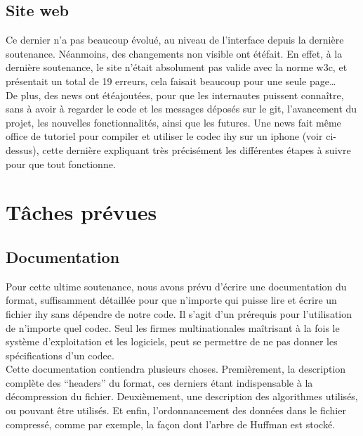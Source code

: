 \documentclass[a4paper,12pt]{article}
\begin{document}
	\subsection{Site web}
Ce dernier n'a pas beaucoup \'evolu\'e, au niveau de l'interface depuis la derni\`ere
soutenance. N\'eanmoins, des changements non visible ont \'et\'efait. En effet, à la
derni\`ere soutenance, le site n'\'etait absolument pas valide avec la norme w3c, et
pr\'esentait un total de 19 erreurs, cela faisait beaucoup pour une seule
page\ldots\\
De plus, des news ont \'et\'eajout\'ees, pour que les internautes puissent connaître,
sans à avoir à regarder le code et les messages d\'epos\'es sur le git, l'avancement
du projet, les nouvelles fonctionnalit\'es, ainsi que les futures. Une news fait
m\^eme office de tutoriel pour compiler et utiliser le codec ihy sur un iphone
(voir ci-dessus), cette derni\`ere expliquant tr\`es pr\'ecis\'ement les diff\'erentes
\'etapes à suivre pour que tout fonctionne.

\newpage

\section{Tâches pr\'evues}
	\subsection{Documentation}
Pour cette ultime soutenance, nous avons pr\'evu d'\'ecrire une documentation du
format, suffisamment d\'etaill\'ee pour que n'importe qui puisse lire et \'ecrire un
fichier ihy sans d\'ependre de notre code. Il s'agit d'un pr\'erequis pour
l'utilisation de n'importe quel codec. Seul les firmes multinationales
maîtrisant à la fois le syst\`eme d'exploitation et les logiciels, peut se
permettre de ne pas donner les sp\'ecifications d'un codec.\\
Cette documentation contiendra plusieurs choses. Premi\`erement, la description
compl\`ete des ``headers'' du format, ces derniers \'etant indispensable à la
d\'ecompression du fichier. Deuxi\`emement, une description des algorithmes
utilis\'es, ou pouvant \^etre utilis\'es. Et enfin, l'ordonnancement des donn\'ees dans
le fichier compress\'e, comme par exemple, la façon dont l'arbre de Huffman est
stock\'e.
\end{document}
